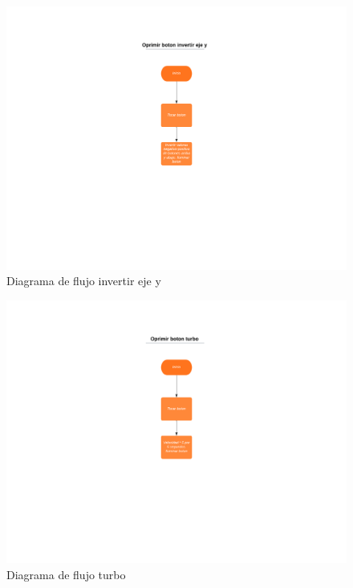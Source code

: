 \documentclass[12pt]{article} %
\begin{document}
\begin{figure}  [!htb]
  \includegraphics[width=\linewidth]{flujo5.png}
  \caption{Diagrama de flujo invertir eje y}
\end{figure}

\begin{figure}  [!htb]
  \includegraphics[width=\linewidth]{flujo6.png}
  \caption{Diagrama de flujo turbo}
\end{figure}
\end{document}
